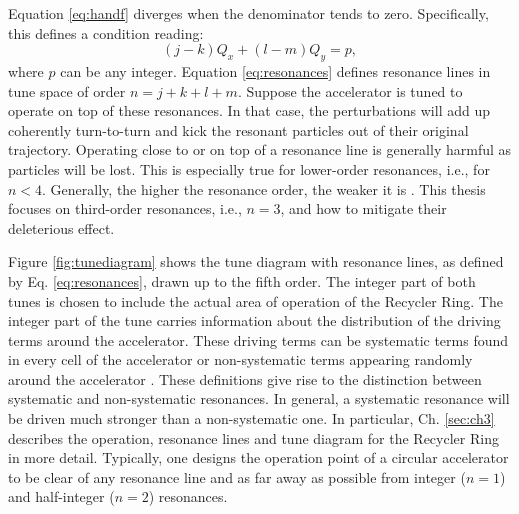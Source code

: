 Equation \ref{eq:handf} diverges when the denominator tends to zero. Specifically, this defines a condition reading:
\begin{equation}
    \label{eq:resonances}
    \left( j-k \right) Q_x + \left( l-m\right) Q_y = p,
\end{equation}
where $p$ can be any integer. Equation \ref{eq:resonances} defines resonance lines in tune space of order $n=j+k+l+m$. Suppose the accelerator is tuned to operate on top of these resonances. In that case, the perturbations will add up coherently turn-to-turn and kick the resonant particles out of their original trajectory. Operating close to or on top of a resonance line is generally harmful as particles will be lost. This is especially true for lower-order resonances, i.e., for $n<4$. Generally, the higher the resonance order, the weaker it is \cite{Wiedemann2015}. This thesis focuses on third-order resonances, i.e., $n=3$, and how to mitigate their deleterious effect. 

Figure \ref{fig:tunediagram} shows the tune diagram with resonance lines, as defined by Eq. \ref{eq:resonances}, drawn up to the fifth order. The integer part of both tunes is chosen to include the actual area of operation of the Recycler Ring. The integer part of the tune carries information about the distribution of the driving terms around the accelerator. These driving terms can be systematic terms found in every cell of the accelerator or non-systematic terms appearing randomly around the accelerator \cite{sylee}. These definitions give rise to the distinction between systematic and non-systematic resonances. In general, a systematic resonance will be driven much stronger than a non-systematic one. In particular, Ch. \ref{sec:ch3} describes the operation, resonance lines and tune diagram for the Recycler Ring in more detail. Typically, one designs the operation point of a circular accelerator to be clear of any resonance line and as far away as possible from integer ($n=1$) and half-integer ($n=2$) resonances.

